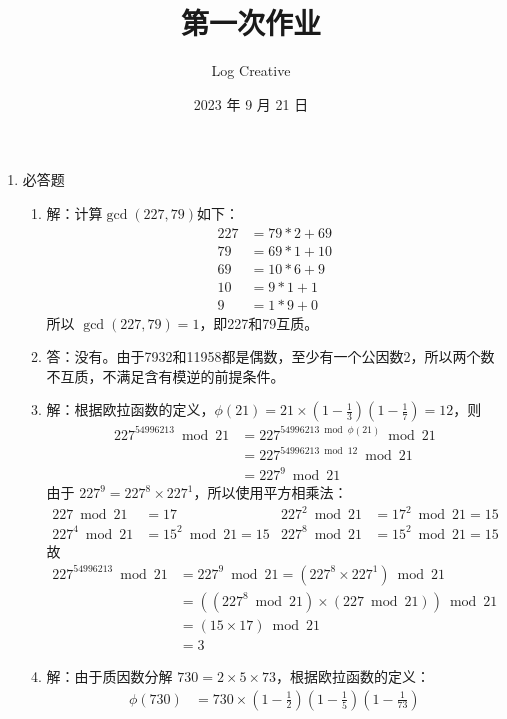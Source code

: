 \documentclass{sjtuarticle}
\title{第一次作业}
\author{Log Creative}
\date{2023 年 9 月 21 日}
\begin{document}
\maketitle
\begin{enumerate}
    \item 必答题
    \begin{enumerate}
        \item 解：计算$\gcd (227,79)$如下：
        \begin{align*}
            227&=79*2+69\\
            79&=69*1+10\\
            69&=10*6+9\\
            10&=9*1+1\\
            9&=1*9+0
        \end{align*}
        所以 $\gcd(227,79)=1$，即227和79互质。
        \item 答：没有。由于7932和11958都是偶数，至少有一个公因数2，所以两个数不互质，不满足含有模逆的前提条件。
        \item 解：根据欧拉函数的定义，$\phi(21)=21\times\left(1-\frac{1}{3}\right)\left(1-\frac{1}{7}\right)=12$，则
        \begin{align*}
            227^{54996213} \bmod 21 &= 227^{54996213\bmod \phi(21)} \bmod 21\\ 
            &= 227^{54996213\bmod 12} \bmod 21 \\
            &= 227^{9} \bmod 21
        \end{align*}
        由于 $227^{9}=227^8\times 227^1$，所以使用平方相乘法：
        \begin{align*}
            227\bmod 21 &= 17 & 227^2\bmod 21 &= 17^2\bmod 21 = 15 \\
            227^4\bmod 21 &= 15^2 \bmod 21 = 15 & 227^8\bmod 21 &= 15^2 \bmod 21 = 15
        \end{align*}
        故
        \begin{align*}
            227^{54996213} \bmod 21 &= 227^{9} \bmod 21 = (227^8\times 227^1 ) \bmod 21 \\
            &= ((227^8 \bmod 21) \times (227 \bmod 21))\bmod 21\\
            &= (15\times 17)\bmod 21 \\
            &= 3
        \end{align*}
        \item 解：由于质因数分解 $730=2\times 5\times 73$，根据欧拉函数的定义：
        \begin{align*}
            \phi(730) &= 730\times \left(1-\frac{1}{2}\right)\left(1-\frac{1}{5}\right)\left(1-\frac{1}{73}\right)\\

\end{align*}
\end{enumerate}
\end{enumerate}
\end{document}

